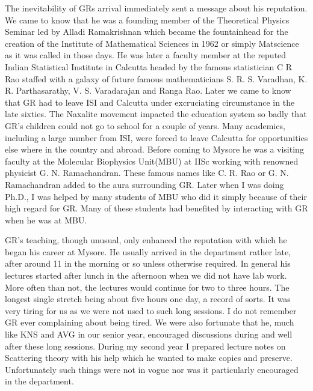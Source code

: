 The inevitability of GRs arrival immediately sent a message about his reputation. We came to know that he was a founding member of the Theoretical Physics Seminar led by Alladi Ramakrishnan which became the fountainhead for the creation of the Institute of Mathematical Sciences in 1962 or simply Matscience as it was called in those days. He was later a faculty member at the reputed Indian Statistical Institute in Calcutta headed by the famous statistician C R Rao staffed with a galaxy of future famous mathematicians S. R. S. Varadhan, K. R. Parthasarathy, V. S. Varadarajan and Ranga Rao. Later we came to know that GR had to leave ISI and Calcutta under excruciating circumstance in the late sixties. The Naxalite movement impacted the education system so badly that GR’s children could not go to school for a couple of years. Many academics, including a large number from ISI, were forced to leave Calcutta for opportunities else where in the country and abroad. Before coming to Mysore he was a visiting faculty at the Molecular Biophysics Unit(MBU) at IISc working with renowned physicist G. N. Ramachandran. These famous names like C. R. Rao or G. N. Ramachandran added to the aura surrounding GR. Later when I was doing Ph.D., I was helped by many students of MBU who did it simply because of their high regard for GR. Many of these students had benefited by interacting with GR when he was at MBU.

GR’s teaching, though unusual, only enhanced the reputation with which he began his career at Mysore. He usually arrived in the department rather late, after around 11 in the morning or so unless otherwise required. In general his lectures started after lunch in the afternoon when we did not have lab work. More often than not, the lectures would continue for two to three hours. The longest single stretch being about five hours one day, a record of sorts. It was very tiring for us as we were not used to such long sessions. I do not remember GR ever complaining about being tired. We were also fortunate that he, much like KNS and AVG in our senior year, encouraged discussions during and well after these long sessions. During my second year I prepared lecture notes on Scattering theory with his help which he wanted to make copies and preserve. Unfortunately such things were not in vogue nor was it particularly encouraged in the department.
\newpage

